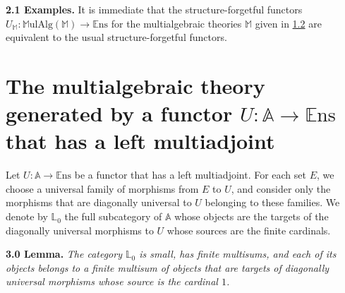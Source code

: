\documentclass{article}
\newenvironment{itenv}[1]
  {\phantomsection\par\medskip\noindent\textbf{#1.}\itshape}
  {\par\medskip}
\newenvironment{rmenv}[1]
  {\phantomsection\par\medskip\noindent\textbf{#1.}\rmfamily}
  {\par\medskip}
\newcommand{\bb}[1]{{\mathbb{#1}}}
\newcommand{\Set}{\mathbb{E}\mathrm{ns}}
\newcommand{\MulAlg}{\mathbb{M}\mathrm{ulAlg}}
\begin{document}
\begin{rmenv}{2.1 Examples}
\label{2.1}
  It is immediate that the structure-forgetful functors $U_\bb{M}\colon\MulAlg(\bb{M})\to\Set$ for the multialgebraic theories $\bb{M}$ given in \hyperref[1.2]{1.2} are equivalent to the usual structure-forgetful functors.
\end{rmenv}



\section{The multialgebraic theory generated by a functor \texorpdfstring{$U\colon\bb{A}\to\Set$}{U:A->Set} that has a left multiadjoint}
\label{3}

Let $U\colon\bb{A}\to\Set$ be a functor that has a left multiadjoint.
For each set $E$, we choose a universal family of morphisms from $E$ to $U$, and consider only the morphisms that are diagonally universal to $U$ belonging to these families.
We denote by $\bb{L}_0$ the full subcategory of $\bb{A}$ whose objects are the targets of the diagonally universal morphisms to $U$ whose sources are the finite cardinals.

\begin{itenv}{3.0 Lemma}
\label{3.0}
  The category $\bb{L}_0$ is small, has finite multisums, and each of its objects belongs to a finite multisum of objects that are targets of diagonally universal morphisms whose source is the cardinal $1$.
\end{itenv}
\end{document}
